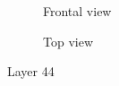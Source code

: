 \begin{figure}[h]
    \centering
    \begin{subfigure}[b]{.45\linewidth}
        
        \caption{Frontal view}
    \end{subfigure}
    \begin{subfigure}[b]{.45\linewidth}
        
        \caption{Top view}
    \end{subfigure}
    \caption{Layer 44}
\end{figure}